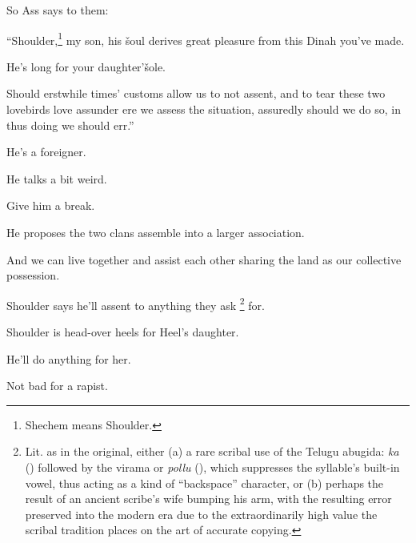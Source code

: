 {
}
{
}
{
	So Ass says to them:
	
	``Shoulder,\footnote{Shechem means Shoulder.} my son,
	his šoul derives great pleasure from this Dinah you've made.

	He's long for your daughter'šole.

	Should erstwhile times' customs allow us to not assent, and to
	tear these two lovebirds love assunder ere we assess the situation,
	assuredly should we do so, in thus doing we should err.''

	He's a foreigner.

	He talks a bit weird.

	Give him a break.
}

{
}
{
}
{
	He proposes the two clans assemble into a larger association.
}

{
}
{
}
{
	And we can live together and assist each other sharing the land as
	our collective possession.
}

{
}
{
}
{
	Shoulder says he'll assent to anything they ask%
	\footnote{
		Lit. as in the original, either (a) a rare scribal use of
		the Telugu abugida: \textsl{ka} () followed by
		the virama or \textsl{pollu} (), which suppresses
		the syllable's built-in vowel, thus acting as a kind of
		``backspace'' character, or (b) perhaps the result of
		an ancient scribe's wife bumping his arm, with the resulting
		error preserved into the modern era due to the extraordinarily
		high value the scribal tradition places on the art of accurate
		copying.
	} for.
}

{
}
{
}
{
	Shoulder is head-over heels for Heel's daughter.

	He'll do anything for her.

	Not bad for a rapist.
}

